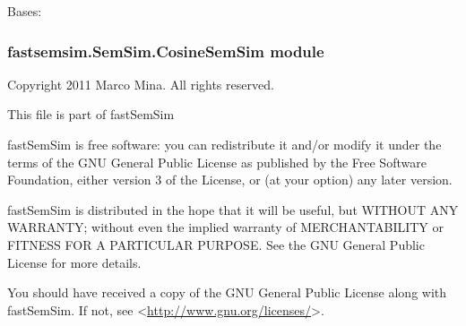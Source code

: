 \documentclass[letterpaper,10pt,english]{sphinxmanual}
\begin{document}
\begin{fulllineitems}
\label{fastsemsim.SemSim:fastsemsim.SemSim.BMASemSim.BMASemSim}
Bases: {\hyperref[fastsemsim.SemSim:fastsemsim.SemSim.MixSemSim.MixSemSim]{}}

\begin{fulllineitems}
\label{fastsemsim.SemSim:fastsemsim.SemSim.BMASemSim.BMASemSim.fair}
\end{fulllineitems}


\end{fulllineitems}



\subsubsection{fastsemsim.SemSim.CosineSemSim module}
\label{fastsemsim.SemSim:module-fastsemsim.SemSim.CosineSemSim}\label{fastsemsim.SemSim:fastsemsim-semsim-cosinesemsim-module}
Copyright 2011 Marco Mina. All rights reserved.

This file is part of fastSemSim

fastSemSim is free software: you can redistribute it and/or modify
it under the terms of the GNU General Public License as published by
the Free Software Foundation, either version 3 of the License, or
(at your option) any later version.

fastSemSim is distributed in the hope that it will be useful,
but WITHOUT ANY WARRANTY; without even the implied warranty of
MERCHANTABILITY or FITNESS FOR A PARTICULAR PURPOSE.  See the
GNU General Public License for more details.

You should have received a copy of the GNU General Public License
along with fastSemSim.  If not, see \textless{}\href{http://www.gnu.org/licenses/}{http://www.gnu.org/licenses/}\textgreater{}.
\end{document}
